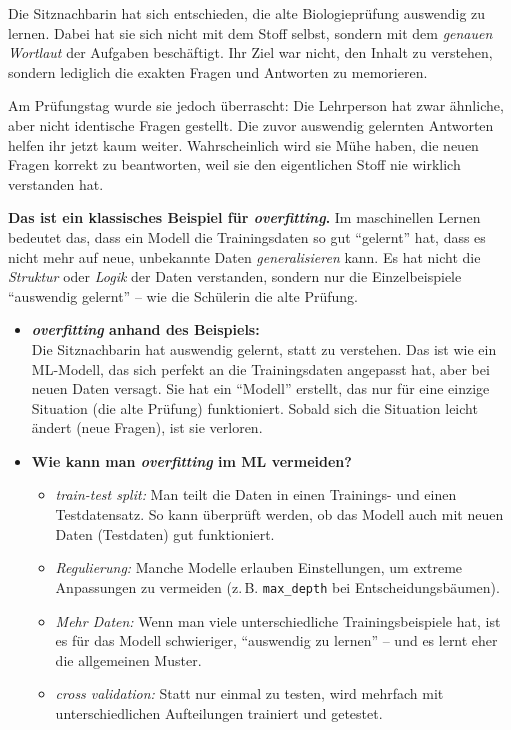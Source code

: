 \begin{aufgabe}{1}

Die Sitznachbarin hat sich entschieden, die alte Biologieprüfung auswendig zu lernen. Dabei hat sie sich nicht mit dem Stoff selbst, sondern mit dem \emph{genauen Wortlaut} der Aufgaben beschäftigt. Ihr Ziel war nicht, den Inhalt zu verstehen, sondern lediglich die exakten Fragen und Antworten zu memorieren.

Am Prüfungstag wurde sie jedoch überrascht: Die Lehrperson hat zwar ähnliche, aber nicht identische Fragen gestellt. Die zuvor auswendig gelernten Antworten helfen ihr jetzt kaum weiter. Wahrscheinlich wird sie Mühe haben, die neuen Fragen korrekt zu beantworten, weil sie den eigentlichen Stoff nie wirklich verstanden hat.

\textbf{Das ist ein klassisches Beispiel für \textit{overfitting}.} Im maschinellen Lernen bedeutet das, dass ein Modell die Trainingsdaten so gut ``gelernt'' hat, dass es nicht mehr auf neue, unbekannte Daten \textit{generalisieren} kann. Es hat nicht die \textit{Struktur} oder \textit{Logik} der Daten verstanden, sondern nur die Einzelbeispiele ``auswendig gelernt'' – wie die Schülerin die alte Prüfung.

\begin{itemize}
  \item \textbf{\textit{overfitting} anhand des Beispiels:}\\
  Die Sitznachbarin hat auswendig gelernt, statt zu verstehen. Das ist wie ein ML-Modell, das sich perfekt an die Trainingsdaten angepasst hat, aber bei neuen Daten versagt. Sie hat ein ``Modell'' erstellt, das nur für eine einzige Situation (die alte Prüfung) funktioniert. Sobald sich die Situation leicht ändert (neue Fragen), ist sie verloren.

  \item \textbf{Wie kann man \textit{overfitting} im ML vermeiden?}\\
  \begin{itemize}
    \item \textit{train-test split:} Man teilt die Daten in einen Trainings- und einen Testdatensatz. So kann überprüft werden, ob das Modell auch mit neuen Daten (Testdaten) gut funktioniert.
    \item \textit{Regulierung:} Manche Modelle erlauben Einstellungen, um extreme Anpassungen zu vermeiden (z.\,B. \texttt{max\_depth} bei Entscheidungsbäumen).
    \item \textit{Mehr Daten:} Wenn man viele unterschiedliche Trainingsbeispiele hat, ist es für das Modell schwieriger, ``auswendig zu lernen'' – und es lernt eher die allgemeinen Muster.
    \item \textit{cross validation:} Statt nur einmal zu testen, wird mehrfach mit unterschiedlichen Aufteilungen trainiert und getestet.
  \end{itemize}
\end{itemize}

\end{aufgabe}


